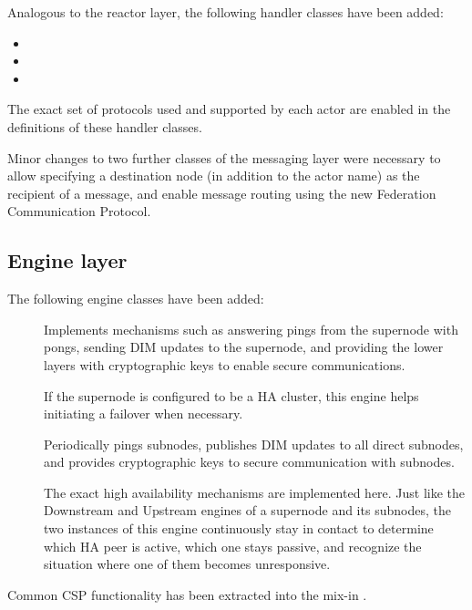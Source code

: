 Analogous to the reactor layer, the following handler classes have been added:
\begin{itemize}
	\item {}
	\item {}
	\item {}
\end{itemize}
The exact set of protocols used and supported by each actor are enabled in the
definitions of these handler classes.

Minor changes to two further classes of the messaging layer were necessary to
allow specifying a destination node (in addition to the actor name) as the
recipient of a message, and enable message routing using the new Federation
Communication Protocol.


\subsection{Engine layer}
The following engine classes have been added:
\begin{description}
	\item []
		Implements mechanisms such as answering pings from the
		supernode with pongs, sending DIM updates to the supernode, and
		providing the lower layers with cryptographic keys to enable
		secure communications.

		If the supernode is configured to be a \gls{HA} cluster,
		this engine helps initiating a failover when necessary.

	\item []
		Periodically pings subnodes, publishes DIM updates to all
		direct subnodes, and provides cryptographic keys to secure
		communication with subnodes.


	\item []
		The exact high availability mechanisms are implemented here.
		Just like the Downstream and Upstream engines of a supernode
		and its subnodes, the two instances of this engine continuously
		stay in contact to determine which HA peer is active, which one
		stays passive, and recognize the situation where one of them
		becomes unresponsive.
\end{description}

Common CSP functionality has been extracted into the mix-in .


